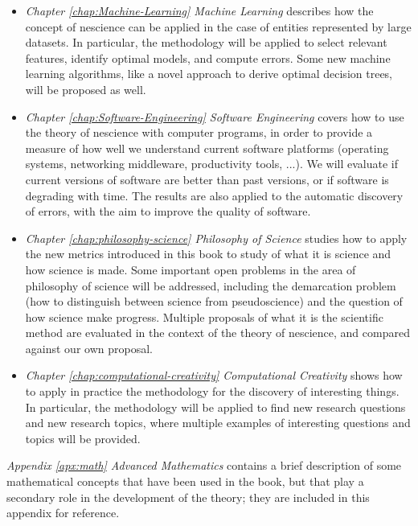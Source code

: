 \begin{itemize}

\item \emph{Chapter \ref{chap:Machine-Learning} Machine Learning} describes how the concept of nescience can be applied in the case of entities represented by large datasets. In particular, the methodology will be applied to select relevant features, identify optimal models, and compute errors. Some new machine learning algorithms, like a novel approach to derive optimal decision trees, will be proposed as well.

\item \emph{Chapter \ref{chap:Software-Engineering} Software Engineering} covers how to use the theory of nescience with computer programs, in order to provide a measure of how well we understand current software platforms (operating systems, networking middleware, productivity tools, ...). We will evaluate if current versions of software are better than past versions, or if software is degrading with time. The results are also applied to the automatic discovery of errors, with the aim to improve the quality of software.

\item \emph{Chapter \ref{chap:philosophy-science} Philosophy of Science} studies how to apply the new metrics introduced in this book to study of what it is science and how science is made. Some important open problems in the area of philosophy of science will be addressed, including the demarcation problem (how to distinguish between science from pseudoscience) and the question of how science make progress. Multiple proposals of what it is the scientific method are evaluated in the context of the theory of nescience, and compared against our own proposal.

\item \emph{Chapter \ref{chap:computational-creativity} Computational Creativity} shows how to apply in practice the methodology for the discovery of interesting things. In particular, the methodology will be applied to find new research questions and new research topics, where multiple examples of interesting questions and topics will be provided.

\end{itemize}

\bigskip

\emph{Appendix \ref{apx:math} Advanced Mathematics} contains a brief description of some mathematical concepts that have been used in the book, but that play a secondary role in the development of the theory; they are included in this appendix for reference.

